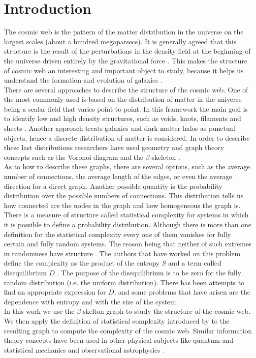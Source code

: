 \documentclass[fleqn,usenatbib]{mnras}
\begin{document}
\section{Introduction}
The cosmic web is the pattern of the matter distribution in the universe on the largest scales (about a hundred megaparsecs). It is generally agreed that this structure is the result of the perturbations in the density field at the beginning of the universe driven entirely by the gravitational force \cite{cosmic_web}. This makes the structure of cosmic web an interesting and important object to study, because it helps us understand the formation and evolution of galaxies \cite{Cautun_2014}. \\
There are several approaches to describe the structure of the cosmic web. One of the most commonly used is based on the distribution of matter in the universe being a scalar field that varies point to point. In this framework the main goal is to identify low and high density structures, such as voids, knots, filaments and sheets \cite{2018MNRAS.473.1195L}. Another approach treats galaxies and dark matter halos as punctual objects, hence a discrete distribution of matter is considered. In order to describe these last distributions researchers have used geometry and graph theory concepts such as the Voronoi diagram \cite{voronoi} and the $\beta$-skeleton \cite{beta_skeleton}.\\
As to how to describe these graphs, there are several options, such as the average number of connections, the average length of the edges, or even the average direction for a direct graph. Another possible quantity is the probability distribution over the possible numbers of connections. This distribution tells us how connected are the nodes in the graph and how homogeneous the graph is. \\
There is a measure of structure called statistical complexity for systems in which it is possible to define a probability distribution. Although there is more than one definition for the statistical complexity every one of them vanishes for fully certain and fully random systems. The reason being that neither of such extremes in randomness have structure \cite{grassberg} \cite{HUBERMAN1986376}. The authors that have worked on this problem define the complexity as the product of the entropy $S$ and a term called disequilibrium $D$ \cite{lopez_comp}. The purpose of the disequilibrium is to be zero for the fully random distribution (i.e. the uniform distribution). There has been attempts to find an appropriate expression for $D$, and some problems that have arisen are the dependence with entropy and with the size of the system.\\
In this work we use the $\beta$-skelton graph to study the structure of the cosmic web. We then apply the definition of statistical complexity introduced by \cite{sig_com} to the resulting graph to compute the complexity of the cosmic web. Similar information theory concepts have been used in other physical subjects like quantum and statistical mechanics \cite{comp_quantum} and observational astrophysics \cite{comp_astro}.  
\end{document}

